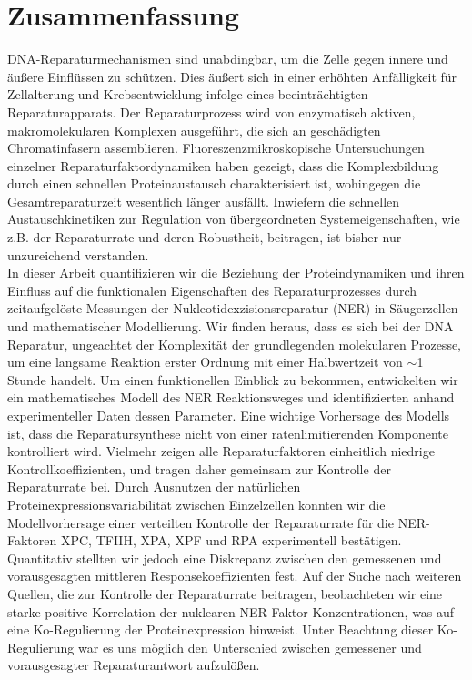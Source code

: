 \chapter*{Zusammenfassung}
\thispagestyle{plain2}


DNA-Reparaturmechanismen sind unabdingbar, um die Zelle gegen innere und \"{a}u\ss{}ere Einfl\"{u}ssen zu sch\"{u}tzen. Dies \"{a}u\ss{}ert sich in einer erh\"{o}hten Anf\"{a}lligkeit f\"{u}r Zellalterung und Krebsentwicklung infolge eines beeintr\"{a}chtigten Reparaturapparats. Der Reparaturprozess wird von enzymatisch aktiven, makromolekularen Komplexen ausgef\"{u}hrt, die sich an gesch\"{a}digten Chromatinfasern assemblieren. Fluoreszenzmikroskopische Untersuchung\-en einzelner Reparaturfaktordynamiken haben gezeigt, dass die Komplexbildung durch einen schnellen Proteinaustausch charakterisiert ist, wohingegen die Gesamtreparaturzeit wesentlich l\"{a}nger ausf\"{a}llt. Inwiefern die schnellen Austauschkinetiken zur Regulation von \"{u}bergeordneten Systemeigenschaften, wie z.B. der Reparaturrate und deren Robustheit, beitragen, ist bisher nur unzureichend verstanden.\\
In dieser Arbeit quantifizieren wir die Beziehung der Proteindynamiken und ihren Einfluss auf die funktionalen Eigenschaften des Reparaturprozesses durch zeitaufgel\"{o}ste Messungen der Nukleotidexzisionsreparatur (NER) in S\"{a}ugerzellen und mathematischer Modellierung. Wir finden heraus, dass es sich bei der DNA Reparatur, ungeachtet der Komplexit\"{a}t der grundlegenden molekularen Prozesse, um eine langsame Reaktion erster Ordnung mit einer Halb\-wertzeit von $\sim$1 Stunde handelt. 
Um einen funktionellen Einblick zu bekommen, entwickelten wir ein ma\-the\-matisches Modell des NER Reaktionsweges und identifizierten anhand experimenteller Daten dessen Parameter. Eine wichtige Vorhersage des Modells ist, dass die Reparatursynthese nicht von einer ratenlimitierenden Komponente kontrolliert wird. Vielmehr zeigen alle Reparaturfaktoren einheitlich niedrige Kontroll\-koeffizienten, und tragen daher gemeinsam zur Kontrolle der Reparaturrate bei. Durch Ausnutzen der nat\"{u}rlichen Proteinexpressionsvariabilit\"{a}t zwischen Einzelzellen konnten wir die Modell\-vorhersage einer verteilten Kontrolle der Reparaturrate f\"{u}r die NER-Faktoren XPC, TFIIH, XPA, XPF und RPA experimentell best\"{a}tigen. Quantitativ stellten wir jedoch eine Diskrepanz zwischen den gemessenen und vorausgesagten mittleren Responsekoeffizienten fest. Auf der Suche nach weiteren Quellen, die zur Kontrolle der Reparaturrate beitragen, beobachteten wir eine starke positive Korrelation der nu\-klearen NER-Faktor-Konzentrationen, was auf eine Ko-Regulierung der Proteinexpression hinweist. Unter Beachtung dieser Ko-Regulierung war es uns m\"{o}glich den Unterschied zwischen gemessener und vorausgesagter Reparaturantwort aufzul\"{o}\ss{}en.\\              
